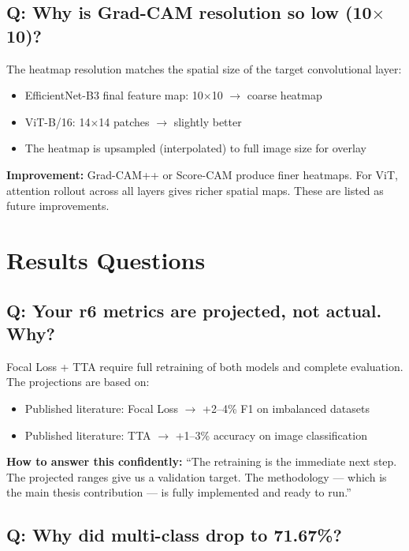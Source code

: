 \documentclass[11pt]{article}
\begin{document}
\subsection{Q: Why is Grad-CAM resolution so low (10$\times$10)?}

The heatmap resolution matches the spatial size of the target convolutional layer:
\begin{itemize}[noitemsep]
    \item EfficientNet-B3 final feature map: 10$\times$10 $\to$ coarse heatmap
    \item ViT-B/16: 14$\times$14 patches $\to$ slightly better
    \item The heatmap is upsampled (interpolated) to full image size for overlay
\end{itemize}

\textbf{Improvement:} Grad-CAM++ or Score-CAM produce finer heatmaps. For ViT, attention rollout across all layers gives richer spatial maps. These are listed as future improvements.

\section{Results Questions}

\subsection{Q: Your r6 metrics are projected, not actual. Why?}

Focal Loss + TTA require full retraining of both models and complete evaluation. The projections are based on:
\begin{itemize}[noitemsep]
    \item Published literature: Focal Loss $\to$ +2--4\% F1 on imbalanced datasets
    \item Published literature: TTA $\to$ +1--3\% accuracy on image classification
\end{itemize}

\textbf{How to answer this confidently:} ``The retraining is the immediate next step. The projected ranges give us a validation target. The methodology --- which is the main thesis contribution --- is fully implemented and ready to run.''

\subsection{Q: Why did multi-class drop to 71.67\%?}
\end{document}
